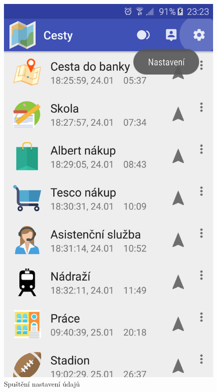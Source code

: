 \documentclass{article}
\begin{document}
\begin{figure}[H]
\begin{minipage}{.5\textwidth}
\centering
                \includegraphics[scale=0.14]{img/screen/nastaveni.png}
        \caption{Spuštění nastavení údajů}
        \label{fig:nastaveniudaju}
\end{minipage}
\begin{minipage}{.5\textwidth}
\centering

\end{minipage}
\end{figure}
\end{document}
